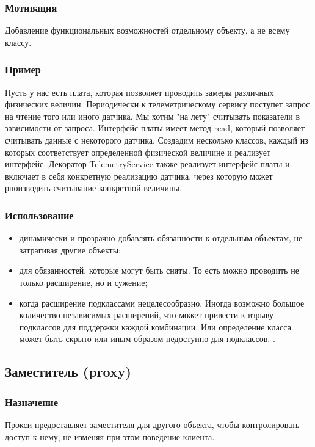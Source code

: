 \documentclass[10pt]{article}
\begin{document}
\subsubsection{Мотивация}
Добавление функциональных возможностей отдельному объекту, а не всему классу.

\subsubsection{Пример}
Пусть у нас есть плата, которая позволяет проводить замеры различных физических величин.
Периодически к телеметрическому сервису поступет запрос на чтение того или иного датчика.
Мы хотим "на лету" считывать показатели в зависимости от запроса.
Интерфейс платы имеет метод read, который позволяет считывать данные с некоторого датчика.
Создадим несколько классов, каждый из которых соответствует определенной физической величине и реализует интерфейс.
Декоратор TelemetryService также реализует интерфейс платы и включает в себя конкретную реализацию датчика, через
которую может рпоизводить считывание конкретной величины.

\subsubsection{Использование}
\begin{itemize}
	\item динамически и прозрачно добавлять обязанности к отдельным объектам, не затрагивая другие объекты;
	\item для обязанностей, которые могут быть сняты. То есть можно проводить не только расширение, но и сужение;
	\item когда расширение подклассами нецелесообразно.
	Иногда возможно большое количество независимых расширений, что может привести к взрыву подклассов для поддержки каждой комбинации.
	Или определение класса может быть скрыто или иным образом недоступно для подклассов.
		. 
\end{itemize}

\subsection{Заместитель (proxy)}
\subsubsection{Назначение}
Прокси предоставляет заместителя для другого объекта, чтобы контролировать доступ к нему,
не изменяя при этом поведение клиента. 
\end{document}
